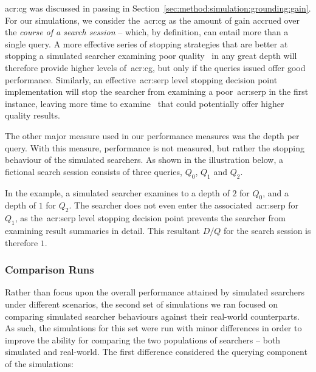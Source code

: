 \gls{acr:cg} was discussed in passing in Section~\ref{sec:method:simulation:grounding:gain}. For our simulations, we consider the~\gls{acr:cg} as the amount of gain accrued over the \emph{course of a search session} -- which, by definition, can entail more than a single query. A more effective series of stopping strategies that are better at stopping a simulated searcher examining poor quality~ in any great depth will therefore provide higher levels of~\gls{acr:cg}, but only if the queries issued offer good performance. Similarly, an effective~\gls{acr:serp} level stopping decision point implementation will stop the searcher from examining a poor~\gls{acr:serp} in the first instance, leaving more time to examine~ that could potentially offer higher quality results.

The other major measure used in our performance measures was the depth per query. With this measure, performance is not measured, but rather the stopping behaviour of the simulated searchers. As shown in the illustration below, a fictional search session consists of three queries, $Q_0$, $Q_1$ and $Q_2$.

\begin{figure}[h]
    \centering
    \vspace*{-6mm}
\end{figure}

In the example, a simulated searcher examines to a depth of $2$ for $Q_0$, and a depth of $1$ for $Q_2$. The searcher does not even enter the associated~\gls{acr:serp} for $Q_1$, as the~\gls{acr:serp} level stopping decision point prevents the searcher from examining result summaries in detail. This resultant $D/Q$ for the search session is therefore $1$.

\subsubsection{Comparison Runs}\label{sec:method:simulation:runs:comparison}
Rather than focus upon the overall performance attained by simulated searchers under different scenarios, the second set of simulations we ran focused on comparing simulated searcher behaviours against their real-world counterparts. As such, the simulations for this set were run with minor differences in order to improve the ability for comparing the two populations of searchers -- both simulated and real-world. The first difference considered the querying component of the simulations:

